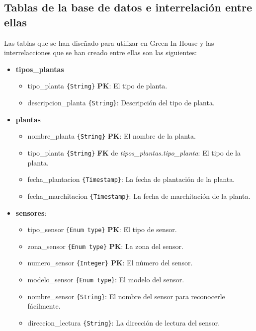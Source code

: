     \subsection{Tablas de la base de datos e interrelación entre ellas}
        Las tablas que se han diseñado para utilizar en Green In House y las interrelacciones que se han creado entre ellas son las siguientes:
        \begin{itemize}
            \item \textbf{tipos\_plantas}
            \begin{itemize}
                \item tipo\_planta \texttt{\{String\}} \textbf{PK}: El tipo de planta.
                \item descripcion\_planta \texttt{\{String\}}: Descripción del tipo de planta.
            \end{itemize}
            \item \textbf{plantas}
            \begin{itemize}
                \item nombre\_planta \texttt{\{String\}} \textbf{PK}: El nombre de la planta.
                \item tipo\_planta \texttt{\{String\}} \textbf{FK} de \textit{tipos\_plantas.tipo\_planta}: El tipo de la planta.
                \item fecha\_plantacion \texttt{\{Timestamp\}}: La fecha de plantación de la planta.
                \item fecha\_marchitacion \texttt{\{Timestamp\}}: La fecha de marchitación de la planta.
            \end{itemize}
            \item \textbf{sensores}:
            \begin{itemize}
                \item tipo\_sensor \texttt{\{Enum type\}} \textbf{PK}: El tipo de sensor.
                \item zona\_sensor \texttt{\{Enum type\}} \textbf{PK}: La zona del sensor.
                \item numero\_sensor \texttt{\{Integer\}} \textbf{PK}: El número del sensor.
                \item modelo\_sensor \texttt{\{Enum type\}}: El modelo del sensor.
                \item nombre\_sensor \texttt{\{String\}}: El nombre del sensor para reconocerle fácilmente.
                \item direccion\_lectura \texttt{\{String\}}: La dirección de lectura del sensor.

\end{itemize}
\end{itemize}

